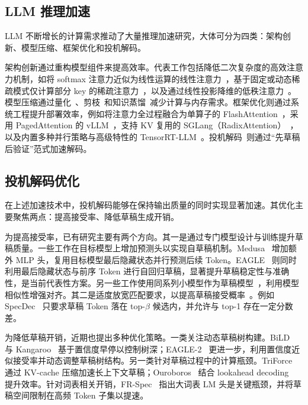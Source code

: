 \documentclass{article} %
\begin{document}
\subsection{LLM 推理加速}

LLM 不断增长的计算需求推动了大量推理加速研究，大体可分为四类：架构创新、模型压缩、框架优化和投机解码。

架构创新通过重构模型组件来提高效率。代表工作包括降低二次复杂度的高效注意力机制，如将 softmax 注意力近似为线性运算的线性注意力~\citep{katharopoulos2020transformers,yang2025parallelizing,yang2024gated}，基于固定或动态稀疏模式仅计算部分 key 的稀疏注意力~\citep{child2019generating,lu2025moba,sun2025efficient}，以及通过线性投影降维的低秩注意力~\citep{deepseek-ai2024deepseekv2}。模型压缩通过量化~\citep{frantar2023gptq,lin2024awq,dettmers2022llmint8,xiao2024smoothquant}、剪枝~\citep{frantar2023sparsegpt,sun2024simple,ma2023llmpruner}和知识蒸馏~\citep{gu2024minillm,hsieh2023distilling,ho2023large}减少计算与内存需求。框架优化则通过系统工程提升部署效率，例如将注意力全过程融合为单算子的 FlashAttention~\citep{dao2022flashattention,dao2023flashattention2,shah2024flashattention3}，采用 PagedAttention 的 vLLM~\citep{kwon2023efficient}，支持 KV 复用的 SGLang（RadixAttention）~\citep{zheng2024sglang}，以及内置多种并行策略与高级特性的 TensorRT-LLM~\citep{nvidia2023tensorrtllm}。投机解码~\citep{leviathan2023fast,chen2023accelerating,stern2018blockwise}则通过“先草稿后验证”范式加速解码。

\subsection{投机解码优化}

在上述加速技术中，投机解码能够在保持输出质量的同时实现显著加速。其优化主要聚焦两点：提高接受率、降低草稿生成开销。

为提高接受率，已有研究主要有两个方向。其一是通过专门模型设计与训练提升草稿质量。一些工作在目标模型上增加预测头以实现自草稿机制。Medusa~\citep{cai2024medusa} 增加额外 MLP 头，复用目标模型最后隐藏状态并行预测后续 Token。EAGLE~\citep{li2024eagle,li2024eagle2,li2025eagle3} 则同时利用最后隐藏状态与前序 Token 进行自回归草稿，显著提升草稿稳定性与准确性，是当前代表性方案。另一些工作使用同系列小模型作为草稿模型~\citep{leviathan2023fast,chen2025cascade}，利用模型相似性增强对齐。其二是适度放宽匹配要求，以提高草稿接受概率~\citep{xia2024unlocking}。例如 SpecDec~\citep{xia2023speculative} 只要求草稿 Token 落在 top-$\beta$ 候选内，并允许与 top-1 存在一定分数差。

为降低草稿开销，近期也提出多种优化策略。一类关注动态草稿树构建。BiLD~\citep{kim2023speculative} 与 Kangaroo~\citep{liu2024kangaroo} 基于置信度早停以控制树深；EAGLE-2~\citep{li2024eagle2} 更进一步，利用置信度近似接受率并动态调整草稿树结构。另一类针对草稿过程中的计算瓶颈。TriForce~\citep{sun2024triforce} 通过 KV-cache 压缩加速长上下文草稿；Ouroboros~\citep{zhao2024ouroboros} 结合 lookahead decoding~\citep{fu2024break} 提升效率。针对词表相关开销，FR-Spec~\citep{zhao2025frspec} 指出大词表 LM 头是关键瓶颈，并将草稿空间限制在高频 Token 子集以提速。
\end{document}
